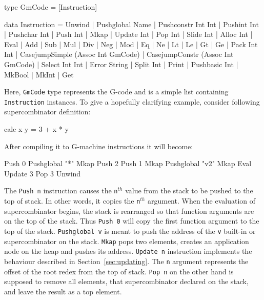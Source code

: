 \documentclass[12pt,a4paper]{report}
\begin{document}
\vspace*{0.2in}
\begin{code}[style=haskell]
  type GmCode = [Instruction]

  data Instruction = Unwind
                   | Pushglobal Name
                   | Pushconstr Int Int
                   | Pushint Int
                   | Pushchar Int
                   | Push Int
                   | Mkap
                   | Update Int
                   | Pop Int
                   | Slide Int
                   | Alloc Int
                   | Eval
                   | Add | Sub | Mul | Div | Neg | Mod
                   | Eq | Ne | Lt | Le | Gt | Ge
                   | Pack Int Int
                   | CasejumpSimple (Assoc Int GmCode)
                   | CasejumpConstr (Assoc Int GmCode)
                   | Select Int Int
                   | Error String
                   | Split Int
                   | Print
                   | Pushbasic Int
                   | MkBool
                   | MkInt
                   | Get
\end{code}

Here, \texttt{GmCode} type represents the G-code and is a simple list containing
\texttt{Instruction} instances. To give a hopefully clarifying example,
consider following supercombinator definition:

\vspace*{0.2in}
\begin{code}[style=haskell,label=lst:sc_to_compile,caption=Supercombinator to compile.]
  calc x y = 3 + x * y
\end{code}

After compiling it to G-machine instructions it will become:

\vspace*{0.2in}
\begin{code}[style=haskell,label=lst:gcode_supercombinator,caption={Compiled
  supercombinator body.}]
  Push 0
  Pushglobal "*"
  Mkap
  Push 2
  Push 1
  Mkap
  Pushglobal "v2"
  Mkap
  Eval
  Update 3
  Pop 3
  Unwind
\end{code}

The \texttt{Push n} instruction causes the \texttt{n}$^{th}$ value from the
stack to be pushed to the top of stack. In other words, it copies the
\texttt{n}$^{th}$ argument. When the evaluation of supercombinator begins, the
stack is rearranged so that function arguments are on the top of the stack.
Thus \texttt{Push 0} will copy the first function argument to the top of the
stack. \texttt{Pushglobal v} is meant to push the address of the \texttt{v}
built-in or supercombinator on the stack. \texttt{Mkap} pops two elements,
creates an application node on the heap and pushes its address. \texttt{Update
n} instruction implements the behaviour described in
Section~\ref{sec:updating}. The \texttt{n} argument represents the offset of
the root redex from the top of stack. \texttt{Pop n} on the other hand is
supposed to remove all elements, that supercombinator declared on the stack,
and leave the result as a top element.
\end{document}
